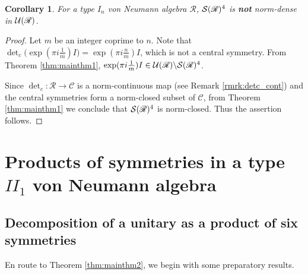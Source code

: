 \documentclass[12pt, preprint]{amsart}
\newtheorem{cor}[thm]{Corollary}
\theoremstyle{definition}
\theoremstyle{remark}
\numberwithin{equation}{section}
\theoremstyle{ser}
\theoremstyle{serr}
\theoremstyle{ser}
\begin{document}
\begin{cor}
\textsl{
For a type $I_n$ von Neumann algebra $\mathscr{R}$, $\mathcal S (\mathscr{R})^4$ is {\bf not} norm-dense in $\mathcal U(\mathscr{R})$.
}
\end{cor}
\begin{proof}
Let $m$ be an integer coprime to $n$. Note that $\det_c \big( \exp( \pi i \frac{1}{m}) I \big) = \exp( \pi i \frac{n}{m}) I$, which is not a central symmetry. From Theorem \ref{thm:mainthm1}, $\exp( \pi i \frac{1}{m}) I \in \mathcal U (\mathscr{R}) \backslash \mathcal S (\mathscr{R})^4$.

 Since $\det _c : \mathscr{R} \to \mathscr{C}$ is a norm-continuous map (see Remark \ref{rmrk:detc_cont}) and the central symmetries form a norm-closed subset of $\mathscr{C}$, from Theorem \ref{thm:mainthm1} we conclude that $\mathcal S (\mathscr{R})^4$ is norm-closed. Thus the assertion follows.
\end{proof}


\section{Products of symmetries in a type $II_1$ von Neumann algebra}


\subsection{Decomposition of a unitary as a product of six symmetries}
En route to Theorem \ref{thm:mainthm2}, we begin with some preparatory results.
\end{document}
